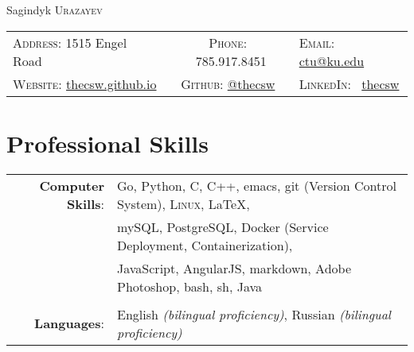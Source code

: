 \documentclass[a4paper,10pt]{article}
\begin{document}
\pagestyle{empty} %

\par{\centering
	{\Huge Sagindyk \textsc{Urazayev}
	}\bigskip\par}


\begin{center}
	\begin{tabular}{lcl}
		\textsc{Address:}   1515 Engel Road                                 &
		\textsc{Phone:} \quad \ 785.917.8451                                &
		\textsc{Email:} \quad \href{mailto:ctu@ku.edu}{ctu@ku.edu}            \\

		\textsc{Website:} \href{https://thecsw.github.io}{thecsw.github.io} &
		\textsc{Github:} \quad \href{https://github.com/thecsw}{@thecsw}    &
		\textsc{LinkedIn:} \ \href{https://linkedin.com/in/thecsw}{thecsw}    \\
	\end{tabular}
\end{center}

\section{Professional Skills}
\begin{tabular}{rl}

	\textbf{Computer Skills}: & Go, Python, C, C++, emacs, git (Version Control System), \textsc{Linux}, \LaTeX, \\& mySQL,
	PostgreSQL, Docker (Service Deployment, Containerization),                                                   \\&
	JavaScript, AngularJS, markdown, Adobe Photoshop, bash, sh, Java                                             \\\\

	\textbf{Languages}:       & English \emph{(bilingual proficiency)}, Russian \emph{(bilingual proficiency)}   \\
\end{tabular}
\end{document}
